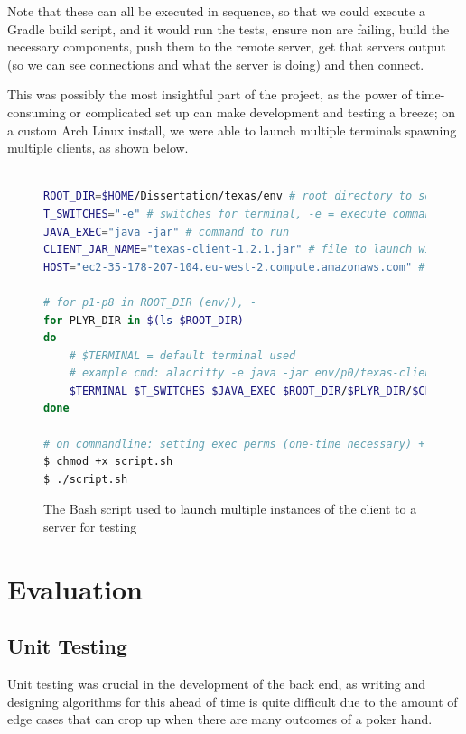 \documentclass[11pt]{article}
\begin{document}
Note that these can all be executed in sequence, so that we could execute a Gradle build script, and it would run the tests, ensure non are failing, build the necessary components, push them to the remote server, get that servers output (so we can see connections and what the server is doing) and then connect. 

This was possibly the most insightful part of the project, as the power of time-consuming or complicated set up can make development and testing a breeze; on a custom Arch Linux install, we were able to launch multiple terminals spawning multiple clients, as shown below. \\

\begin{figure}
\begin{lstlisting}[language=bash,frame=single]

ROOT_DIR=$HOME/Dissertation/texas/env # root directory to search in
T_SWITCHES="-e" # switches for terminal, -e = execute command
JAVA_EXEC="java -jar" # command to run
CLIENT_JAR_NAME="texas-client-1.2.1.jar" # file to launch with above
HOST="ec2-35-178-207-104.eu-west-2.compute.amazonaws.com" # server address

# for p1-p8 in ROOT_DIR (env/), -
for PLYR_DIR in $(ls $ROOT_DIR)
do
	# $TERMINAL = default terminal used
	# example cmd: alacritty -e java -jar env/p0/texas-client-1.2.1.jar 192.168.0.1
	$TERMINAL $T_SWITCHES $JAVA_EXEC $ROOT_DIR/$PLYR_DIR/$CLIENT_JAR_NAME $HOST
done

# on commandline: setting exec perms (one-time necessary) + run script
$ chmod +x script.sh
$ ./script.sh
\end{lstlisting}
\caption{The Bash script used to launch multiple instances of the client to a server for testing}
\end{figure}


\newpage
\section{Evaluation}
\subsection{Unit Testing}
Unit testing was crucial in the development of the back end, as writing and designing algorithms for this ahead of time is quite difficult due to the amount of edge cases that can crop up when there are many outcomes of a poker hand. \\
\end{document}
